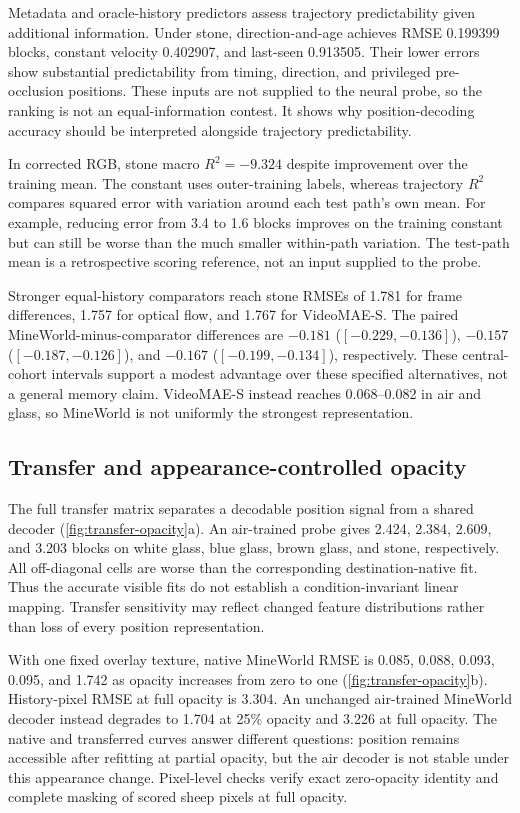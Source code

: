 \documentclass{article}
\begin{document}
Metadata and oracle-history predictors assess trajectory predictability given additional information. Under stone, direction-and-age achieves RMSE 0.199399 blocks, constant velocity 0.402907, and last-seen 0.913505. Their lower errors show substantial predictability from timing, direction, and privileged pre-occlusion positions. These inputs are not supplied to the neural probe, so the ranking is not an equal-information contest. It shows why position-decoding accuracy should be interpreted alongside trajectory predictability.

In corrected RGB, stone macro $R^2=-9.324$ despite improvement over the training mean. The constant uses outer-training labels, whereas trajectory $R^2$ compares squared error with variation around each test path's own mean. For example, reducing error from 3.4 to 1.6 blocks improves on the training constant but can still be worse than the much smaller within-path variation. The test-path mean is a retrospective scoring reference, not an input supplied to the probe.

Stronger equal-history comparators reach stone RMSEs of 1.781 for frame differences, 1.757 for optical flow, and 1.767 for VideoMAE-S. The paired MineWorld-minus-comparator differences are $-0.181$ ($[-0.229,-0.136]$), $-0.157$ ($[-0.187,-0.126]$), and $-0.167$ ($[-0.199,-0.134]$), respectively. These central-cohort intervals support a modest advantage over these specified alternatives, not a general memory claim. VideoMAE-S instead reaches 0.068--0.082 in air and glass, so MineWorld is not uniformly the strongest representation.

\subsection{Transfer and appearance-controlled opacity}
\label{sec:transfer-opacity}
The full transfer matrix separates a decodable position signal from a shared decoder (\autoref{fig:transfer-opacity}a). An air-trained probe gives 2.424, 2.384, 2.609, and 3.203 blocks on white glass, blue glass, brown glass, and stone, respectively. All off-diagonal cells are worse than the corresponding destination-native fit. Thus the accurate visible fits do not establish a condition-invariant linear mapping. Transfer sensitivity may reflect changed feature distributions rather than loss of every position representation.

With one fixed overlay texture, native MineWorld RMSE is 0.085, 0.088, 0.093, 0.095, and 1.742 as opacity increases from zero to one (\autoref{fig:transfer-opacity}b). History-pixel RMSE at full opacity is 3.304. An unchanged air-trained MineWorld decoder instead degrades to 1.704 at 25\% opacity and 3.226 at full opacity. The native and transferred curves answer different questions: position remains accessible after refitting at partial opacity, but the air decoder is not stable under this appearance change. Pixel-level checks verify exact zero-opacity identity and complete masking of scored sheep pixels at full opacity.
\end{document}
